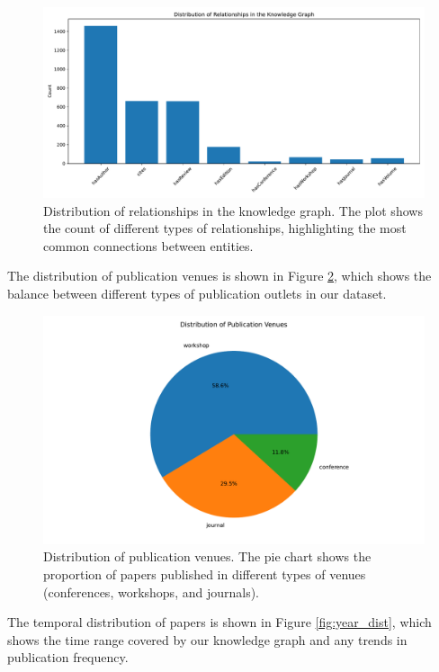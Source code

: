 \documentclass[10pt,a4paper]{article}
\begin{document}
\begin{figure}[H]
    \centering
    \includegraphics[width=\textwidth]{img/relationship_distribution.pdf}
    \caption{Distribution of relationships in the knowledge graph. The plot shows the count of different types of relationships, highlighting the most common connections between entities.}
    \label{fig:relationship_dist}
\end{figure}

The distribution of publication venues is shown in Figure \ref{fig:venue_dist}, which shows the balance between different types of publication outlets in our dataset.

\begin{figure}[H]
    \centering
    \includegraphics[width=\textwidth]{img/venue_distribution.pdf}
    \caption{Distribution of publication venues. The pie chart shows the proportion of papers published in different types of venues (conferences, workshops, and journals).}
    \label{fig:venue_dist}
\end{figure}

The temporal distribution of papers is shown in Figure \ref{fig:year_dist}, which shows the time range covered by our knowledge graph and any trends in publication frequency.
\end{document}
